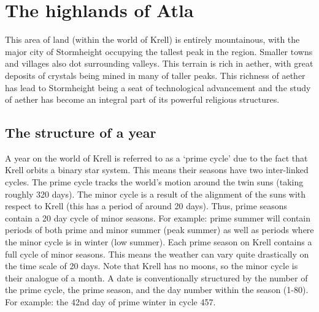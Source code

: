 \documentclass[a4paper,11pt,oneside]{book}
\newcommand{\textlf}[1]{\textbf{\titlecap{#1}}}
\begin{document}
%



\chapter{The highlands of Atla}
This area of land (within the world of Krell) is entirely mountainous, with the major city of Stormheight occupying the tallest peak in the region. Smaller towns and villages also dot surrounding valleys. This terrain is rich in aether, with great deposits of crystals being mined in many of taller peaks. This richness of aether has lead to Stormheight being a seat of technological advancement and the study of aether has become an integral part of its powerful religious structures.  

\section{The structure of a year}
A year on the world of Krell is referred to as a `prime cycle' due to the fact that Krell orbits a binary star system. This means their seasons have two inter-linked cycles. The prime cycle tracks the world's motion around the twin suns (taking roughly 320 days). The minor cycle is a result of the alignment of the suns with respect to Krell (this has a period of around 20 days). Thus, prime seasons contain a 20 day cycle of minor seasons. For example: prime summer will contain periods of both prime and minor summer (peak summer) as well as periods where the minor cycle is in winter (low summer). Each prime season on Krell contains a full cycle of minor seasons. This means the weather can vary quite drastically on the time scale of 20 days. Note that Krell has no moons, so the minor cycle is their analogue of a month. A date is conventionally structured by the number of the prime cycle, the prime season, and the day number within the season (1-80). For example: the 42nd day of prime winter in cycle 457.
\end{document}
